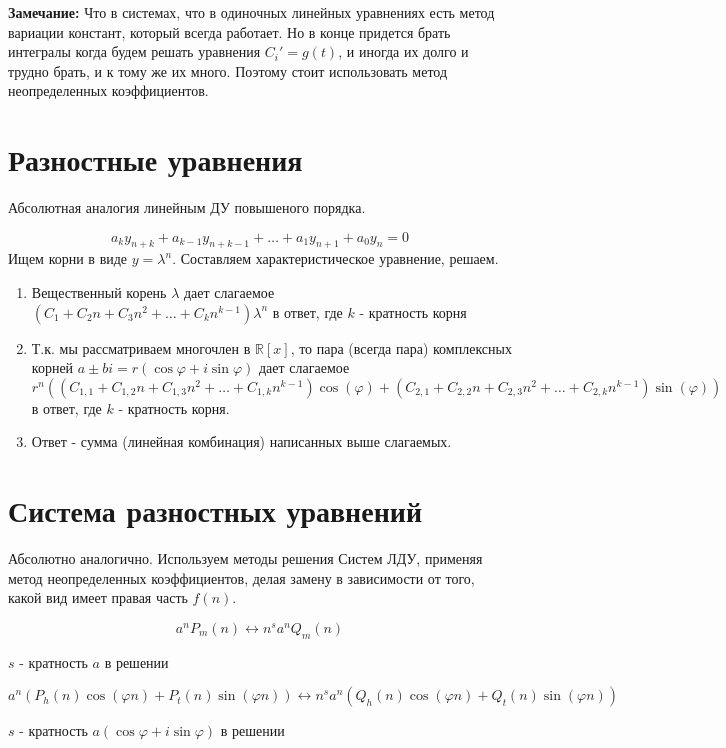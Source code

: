 \documentclass[11pt]{article}
\begin{document}
	\textbf{Замечание:} Что в системах, что в одиночных линейных уравнениях есть метод вариации констант, который всегда работает. Но в конце придется брать интегралы когда будем решать уравнения $C_i' = g(t)$, и иногда их долго и трудно брать, и к тому же их много. Поэтому стоит использовать метод неопределенных коэффициентов. 
	
	\section{Разностные уравнения}
	
	Абсолютная аналогия линейным ДУ повышеного порядка.
	
	$$a_{k} y_{n+k} +a_{k-1} y_{n+k-1} + \dots + a_{1} y_{n+1} + a_{0} y_n = 0 $$
	Ищем корни в виде $y = \lambda^{n}$. Составляем характеристическое уравнение, решаем.
	\begin{enumerate}
		\item Вещественный корень $\lambda$ дает слагаемое $(C_1 + C_2 n + C_3 n^2 + \dots + C_k n^{k-1})\lambda^{n}$ в ответ, где $k$ - кратность корня
		\item Т.к. мы рассматриваем многочлен в $\mathbb{R}[x]$, то пара (всегда пара) комплексных корней $a \pm bi = r(\cos \varphi + i\sin \varphi)$ дает слагаемое $r^n((C_{1, 1} + C_{1, 2} n + C_{1, 3} n^2 + \dots + C_{1, k} n^{k-1}) \cos(\varphi) + (C_{2, 1} + C_{2, 2} n + C_{2, 3} n^2 + \dots + C_{2, k} n^{k-1}) \sin(\varphi))$ в ответ, где $k$ - кратность корня.
		\item Ответ - сумма (линейная комбинация) написанных выше слагаемых.
		
	\end{enumerate}

	\section{Система разностных уравнений}
	
	Абсолютно аналогично. Используем методы решения Систем ЛДУ, применяя метод неопределенных коэффициентов, делая замену в зависимости от того, какой вид имеет правая часть $f(n)$.
	
	$$a^n P_m(n) \leftrightarrow n^s a^n Q_m(n)$$
	
	$s$ - кратность $a$ в решении
	
	$$a^n(P_h(n)\cos (\varphi n) + P_t(n)\sin (\varphi n))\leftrightarrow n^s a^n(Q_h(n)\cos (\varphi n) + Q_t(n)\sin (\varphi n))$$
	
	$s$ - кратность $a(\cos \varphi + i\sin \varphi)$ в решении
	
\end{document}
